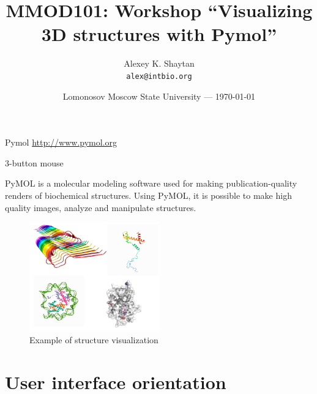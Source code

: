 \documentclass{article}
\title{MMOD101: Workshop ``Visualizing 3D structures with Pymol''} %
\author{Alexey K. Shaytan\\ \texttt{alex@intbio.org}} %
\date{Lomonosov Moscow State University --- \today} %
\begin{document}
\maketitle %

\begin{warn}[Requirements:]

Pymol \url{http://www.pymol.org} 

3-button mouse
\end{warn}


    PyMOL is a molecular modeling software used for making publication-quality renders of biochemical structures. Using PyMOL, it is possible to make high quality images, analyze and manipulate structures.


\begin{figure}[h!]
    \centering
    \includegraphics[width=0.5\textwidth]{workshops/pymol/imgs/intrimg1.png}
    \caption[]{Example of structure visualization}
    \label{intfig1}
\end{figure}

\tableofcontents


\section{User interface orientation}
\end{document}
